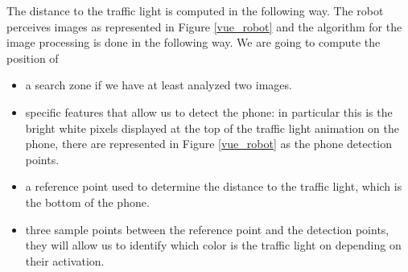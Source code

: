\documentclass[14pt,a4paper]{article}
\theoremstyle{definition}
\begin{document}
The distance to the traffic light is computed in the following way. The robot perceives images as represented in Figure \ref{vue_robot} and the algorithm for the image processing is done in the following way. We are going to compute the position of 
\begin{itemize}
\item a search zone if we have at least analyzed two images.
\item specific features that allow us to detect the phone: in particular this is the bright white pixels displayed at the top of the traffic light animation on the phone, there are represented in Figure \ref{vue_robot} as the phone detection points.
\item a reference point used to determine the distance to the traffic light, which is the bottom of the phone.
\item three sample points between the reference point and the detection points, they will allow us to identify which color is the traffic light on depending on their activation.
\end{itemize}
\end{document}
